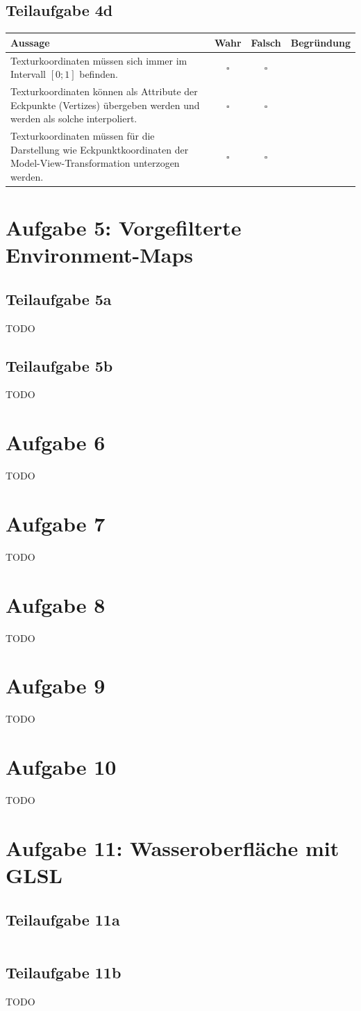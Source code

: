 \documentclass[a4paper]{scrartcl}
\begin{document}
\subsection*{Teilaufgabe 4d}
\begin{tabular}{p{6cm}ccp{5cm}}\toprule
Aussage  & Wahr & Falsch & Begründung \\\midrule
Texturkoordinaten müssen sich immer im Intervall $[0; 1]$ befinden. & $\square$ & $\square$ & ~ \\
Texturkoordinaten können als Attribute der Eckpunkte (Vertizes) übergeben werden und werden als solche interpoliert.  & $\square$    & $\square$      & ~          \\
Texturkoordinaten müssen für die Darstellung wie Eckpunktkoordinaten der Model-View-Transformation unterzogen werden. & $\square$    & $\square$      & ~          \\\bottomrule
\end{tabular}


\section*{Aufgabe 5: Vorgefilterte Environment-Maps}
\subsection*{Teilaufgabe 5a}
TODO
\subsection*{Teilaufgabe 5b}
TODO

\section*{Aufgabe 6}
TODO

\section*{Aufgabe 7}
TODO

\section*{Aufgabe 8}
TODO

\section*{Aufgabe 9}
TODO

\section*{Aufgabe 10}
TODO

\section*{Aufgabe 11: Wasseroberfläche mit GLSL}
\subsection*{Teilaufgabe 11a}
\inputminted[linenos, numbersep=5pt, tabsize=4, frame=lines, label=shader.frag]{glsl}{shader.frag}

\subsection*{Teilaufgabe 11b}
TODO
\end{document}
